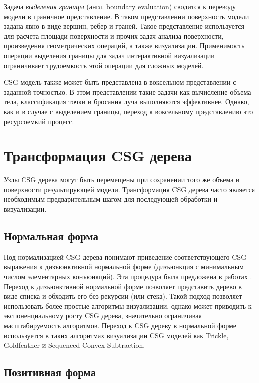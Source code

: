 Задача \textit{выделения границы} (англ. boundary evaluation) сводится к переводу модели в граничное представление. В таком представлении поверхность модели задана явно в виде вершин, ребер и граней. Такое представление используется для расчета площади поверхности и прочих задач анализа поверхности, произведения геометрических операций, а также визуализации. Применимость операции выделения границы для задач интерактивной визуализации ограничивает трудоемкость этой операции для сложных моделей.

CSG модель также может быть представлена в воксельном представлении с заданной точностью. В этом представлении такие задачи как вычисление объема тела, классификация точки и бросания луча выполняются эффективнее. Однако, как и в случае с выделением границы, переход к воксельному представлению это ресурсоемкий процесс.

\section{Трансформация CSG дерева} \label{sect_csg_transform}

Узлы CSG дерева могут быть перемещены при сохранении того же объема и поверхности результирующей модели. Трансформация CSG дерева часто является необходимым предварительным шагом для последующей обработки и визуализации.

\subsection{Нормальная форма} \label{sect_csg_normalization}

Под нормализацией CSG дерева понимают приведение соответствующего CSG выражения к дизъюнктивной нормальной форме (дизъюнкция с минимальным числом элементарных конъюнкций). Эта процедура была предложена в работах . Переход к дизъюнктивной нормальной форме позволяет представить дерево в виде списка и обходить его без рекурсии (или стека). Такой подход позволяет использовать более простые алгоритмы визуализации, однако может приводить к экспоненциальному росту CSG дерева, значительно ограничивая  масштабируемость алгоритмов. Переход к CSG дереву в нормальной форме используется в таких алгоритмах визуализации CSG моделей как Trickle, Goldfeather и Sequenced Convex Subtraction.

\subsection{Позитивная форма} \label{sect_csg_positive_form}

